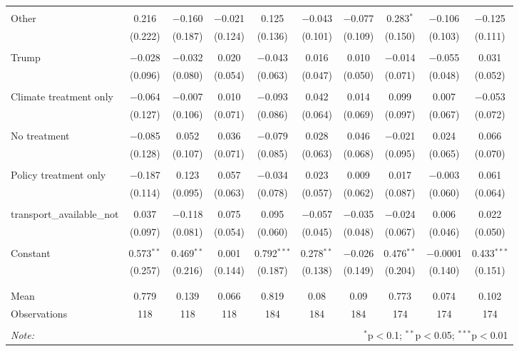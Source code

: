 \begin{tabular}{@{\extracolsep{5pt}}lccccccccc}
  & & & & & & & & & \\ 
 Other & 0.216 & $-$0.160 & $-$0.021 & 0.125 & $-$0.043 & $-$0.077 & 0.283$^{*}$ & $-$0.106 & $-$0.125 \\ 
  & (0.222) & (0.187) & (0.124) & (0.136) & (0.101) & (0.109) & (0.150) & (0.103) & (0.111) \\ 
  & & & & & & & & & \\ 
 Trump & $-$0.028 & $-$0.032 & 0.020 & $-$0.043 & 0.016 & 0.010 & $-$0.014 & $-$0.055 & 0.031 \\ 
  & (0.096) & (0.080) & (0.054) & (0.063) & (0.047) & (0.050) & (0.071) & (0.048) & (0.052) \\ 
  & & & & & & & & & \\ 
 Climate treatment only & $-$0.064 & $-$0.007 & 0.010 & $-$0.093 & 0.042 & 0.014 & 0.099 & 0.007 & $-$0.053 \\ 
  & (0.127) & (0.106) & (0.071) & (0.086) & (0.064) & (0.069) & (0.097) & (0.067) & (0.072) \\ 
  & & & & & & & & & \\ 
 No treatment & $-$0.085 & 0.052 & 0.036 & $-$0.079 & 0.028 & 0.046 & $-$0.021 & 0.024 & 0.066 \\ 
  & (0.128) & (0.107) & (0.071) & (0.085) & (0.063) & (0.068) & (0.095) & (0.065) & (0.070) \\ 
  & & & & & & & & & \\ 
 Policy treatment only & $-$0.187 & 0.123 & 0.057 & $-$0.034 & 0.023 & 0.009 & 0.017 & $-$0.003 & 0.061 \\ 
  & (0.114) & (0.095) & (0.063) & (0.078) & (0.057) & (0.062) & (0.087) & (0.060) & (0.064) \\ 
  & & & & & & & & & \\ 
 transport\_available\_not & 0.037 & $-$0.118 & 0.075 & 0.095 & $-$0.057 & $-$0.035 & $-$0.024 & 0.006 & 0.022 \\ 
  & (0.097) & (0.081) & (0.054) & (0.060) & (0.045) & (0.048) & (0.067) & (0.046) & (0.050) \\ 
  & & & & & & & & & \\ 
 Constant & 0.573$^{**}$ & 0.469$^{**}$ & 0.001 & 0.792$^{***}$ & 0.278$^{**}$ & $-$0.026 & 0.476$^{**}$ & $-$0.0001 & 0.433$^{***}$ \\ 
  & (0.257) & (0.216) & (0.144) & (0.187) & (0.138) & (0.149) & (0.204) & (0.140) & (0.151) \\ 
  & & & & & & & & & \\ 
\hline \\[-1.8ex] 
Mean & 0.779 & 0.139 & 0.066 & 0.819 & 0.08 & 0.09 & 0.773 & 0.074 & 0.102 \\ 
Observations & 118 & 118 & 118 & 184 & 184 & 184 & 174 & 174 & 174 \\ 
\hline 
\hline \\[-1.8ex] 
\textit{Note:}  & \multicolumn{9}{r}{$^{*}$p$<$0.1; $^{**}$p$<$0.05; $^{***}$p$<$0.01} \\ 
\end{tabular} 
